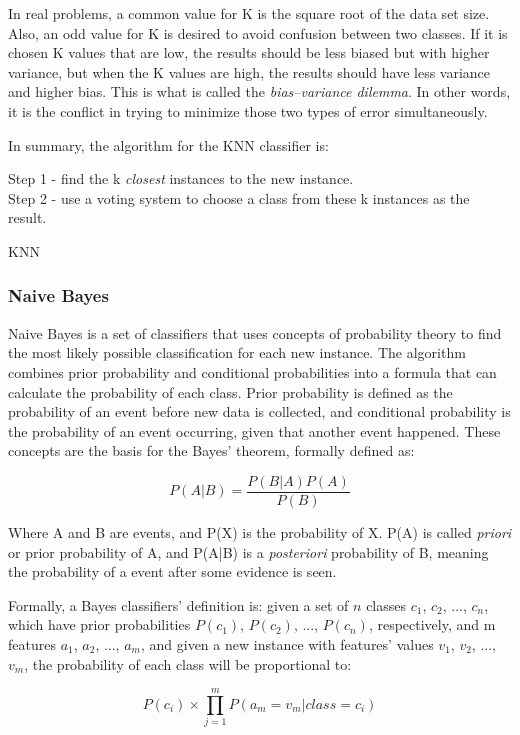 In real problems, a common value for K is the square root of the data set size. Also, an odd value for K is desired to avoid confusion between two classes. If it is chosen K values that are low, the results should be less biased but with higher variance, but when the K values are high, the results should have less variance and higher bias. This is what is called the \emph{bias–variance dilemma}. In other words, it is the conflict in trying to minimize those two types of error simultaneously.

In summary, the algorithm for the KNN classifier is:

\begin{algorithm}[H]
Step 1 - find the k \emph{closest} instances to the new instance. \\
Step 2 - use a voting system to choose a class from these k instances as the result.
\caption{KNN}
\end{algorithm}

\subsubsection{Naive Bayes}

Naive Bayes is a set of classifiers that uses concepts of probability theory to find the most likely possible classification for each new instance. The algorithm combines prior probability and conditional probabilities into a formula that can calculate the probability of each class. Prior probability is defined as the probability of an event before new data is collected, and conditional probability is the probability of an event occurring, given that another event happened. These concepts are the basis for the Bayes' theorem, formally defined as:

\[ P(A|B) = \frac{P(B|A)P(A)}{P(B)} \]

Where A and B are events, and P(X) is the probability of X. P(A) is called \emph{priori} or prior probability of A, and P(A|B) is a \emph{posteriori} probability of B, meaning the probability of a event after some evidence is seen.

Formally, a Bayes classifiers' definition is: given a set of $n$ classes $c_1$, $c_2$, ..., $c_n$, which have prior probabilities $P(c_1)$, $P(c_2)$, ..., $P(c_n)$, respectively, and m features $a_1$, $a_2$, ..., $a_m$, and given a new instance with features' values $v_1$, $v_2$, ..., $v_m$, the probability of each class will be proportional to:

\[ P(c_i) \times \prod_{j=1}^m P(a_m=v_m | class = c_i) \]

